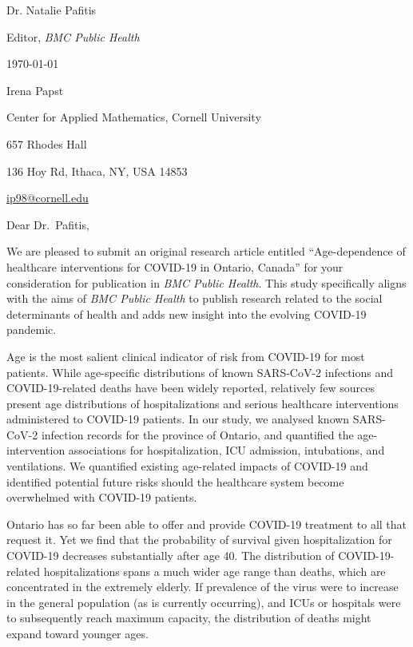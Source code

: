 \documentclass[12pt,letterpaper]{letter}
\newcommand{\journalname}{\emph{BMC Public Health}}
\begin{document}
\begin{multicols}{2}
\footnotesize
\begin{flushleft}

Dr. Natalie Pafitis

Editor, \journalname{}

\vfill

{\normalsize \mydate
\today}
\end{flushleft}

\columnbreak

\begin{flushright}
Irena Papst

Center for Applied Mathematics, Cornell University

657 Rhodes Hall

136 Hoy Rd, Ithaca, NY, USA 14853

\href{mailto:ip98@cornell.edu}{ip98@cornell.edu}
\end{flushright}

\end{multicols}

\setlength{\parskip}{1em}
\thispagestyle{empty}

\vspace{-1em}

Dear Dr.\ Pafitis,

We are pleased to submit an original research article entitled
``Age-dependence of healthcare interventions for COVID-19 in Ontario,
Canada'' for your consideration for publication in \journalname{}. This study specifically aligns with the aims of \journalname{} to publish research related to the social determinants of health and adds new insight into the evolving COVID-19 pandemic.

Age is the most salient clinical indicator of risk from COVID-19 for
most patients. While age-specific distributions of known SARS-CoV-2
infections and COVID-19-related deaths have been widely reported,
relatively few sources present age distributions of hospitalizations
and serious healthcare interventions administered to COVID-19
patients. In our study, we analysed \nccmpresolved{} known SARS-CoV-2 infection
records for the province of Ontario, and quantified the age-intervention associations
for hospitalization, ICU admission, intubations, and ventilations. We
quantified existing age-related impacts of COVID-19 and identified
potential future risks should the healthcare system become overwhelmed
with COVID-19 patients.

Ontario has so far been able to offer and provide COVID-19 treatment
to all that request it. Yet we find that the probability of survival
given hospitalization for COVID-19 decreases substantially after age
40. The distribution of COVID-19-related hospitalizations spans a much
wider age range than deaths, which are concentrated in the extremely
elderly. If prevalence of the virus were to increase in the general
population (as is currently occurring), and ICUs or hospitals were to
subsequently reach maximum capacity, the distribution of deaths might expand toward younger ages.
\end{document}
